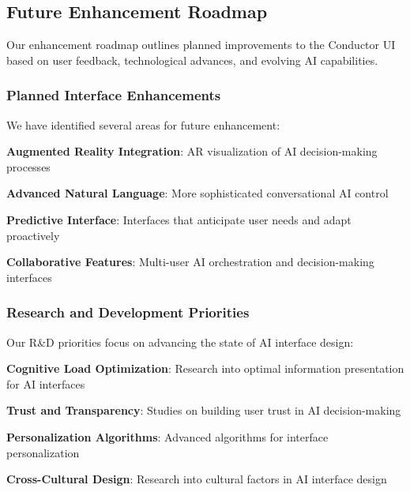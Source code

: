 \subsection*{Future Enhancement Roadmap}

Our enhancement roadmap outlines planned improvements to the Conductor UI based on user feedback, technological advances, and evolving AI capabilities.

\subsubsection*{Planned Interface Enhancements}

We have identified several areas for future enhancement:

\begin{compactlist}
    \item \textbf{Augmented Reality Integration}: AR visualization of AI decision-making processes
    \item \textbf{Advanced Natural Language}: More sophisticated conversational AI control
    \item \textbf{Predictive Interface}: Interfaces that anticipate user needs and adapt proactively
    \item \textbf{Collaborative Features}: Multi-user AI orchestration and decision-making interfaces
\end{compactlist}

\subsubsection*{Research and Development Priorities}

Our R\&D priorities focus on advancing the state of AI interface design:

\begin{expandedlist}
    \item \textbf{Cognitive Load Optimization}: Research into optimal information presentation for AI interfaces
    \item \textbf{Trust and Transparency}: Studies on building user trust in AI decision-making
    \item \textbf{Personalization Algorithms}: Advanced algorithms for interface personalization
    \item \textbf{Cross-Cultural Design}: Research into cultural factors in AI interface design
\end{expandedlist}

